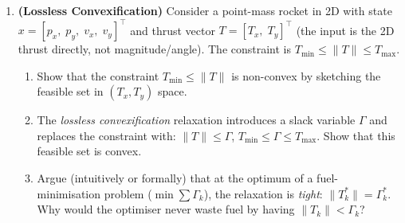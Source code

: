 \begin{enumerate}
\item \textbf{(Lossless Convexification)}
Consider a point-mass rocket in 2D with state $x = [p_x,\; p_y,\; v_x,\; v_y]^\top$ and thrust vector $T = [T_x,\; T_y]^\top$ (the input is the 2D thrust directly, not magnitude/angle). The constraint is $T_{\min} \le \|T\| \le T_{\max}$.
\begin{enumerate}
	\item Show that the constraint $T_{\min} \le \|T\|$ is non-convex by sketching the feasible set in $(T_x, T_y)$ space.
	\item The \emph{lossless convexification} relaxation introduces a slack variable $\Gamma$ and replaces the constraint with: $\|T\| \le \Gamma$, $T_{\min} \le \Gamma \le T_{\max}$. Show that this feasible set is convex.
	\item Argue (intuitively or formally) that at the optimum of a fuel-minimisation problem ($\min \sum \Gamma_k$), the relaxation is \emph{tight}: $\|T^*_k\| = \Gamma^*_k$. Why would the optimiser never waste fuel by having $\|T_k\| < \Gamma_k$?
\end{enumerate}

\end{enumerate}
